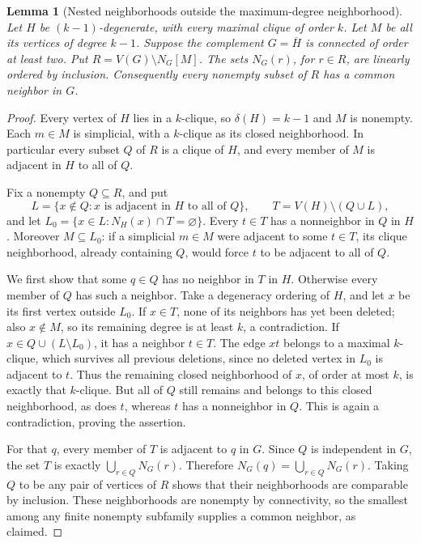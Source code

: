 \documentclass[11pt,a4paper]{article}
\newtheorem{lemma}[theorem]{Lemma}
\theoremstyle{remark}
\begin{document}
\begin{lemma}[Nested neighborhoods outside the maximum-degree neighborhood]
\label{r9:common}
Let $H$ be $(k-1)$-degenerate, with every maximal clique of order $k$.
Let $M$ be all its vertices of degree $k-1$.
Suppose the complement $G=\overline H$ is connected of order at least
two. Put $R=V(G)\setminus N_G[M]$.
The sets $N_G(r)$, for $r\in R$, are linearly ordered by inclusion.
Consequently every nonempty subset of $R$ has a common neighbor in $G$.
\end{lemma}
\begin{proof}
Every vertex of $H$ lies in a $k$-clique, so $\delta(H)=k-1$ and
$M$ is nonempty. Each $m\in M$ is simplicial, with a $k$-clique as
its closed neighborhood. In particular every subset $Q$ of $R$ is
a clique of $H$, and every member of $M$ is adjacent in $H$ to all of $Q$.

Fix a nonempty $Q\subseteq R$, and put
\[
 L=\{x\notin Q:x\text{ is adjacent in }H\text{ to all of }Q\},
 \qquad T=V(H)\setminus(Q\cup L),
\]
and let $L_0=\{x\in L:N_H(x)\cap T=\varnothing\}$.
Every $t\in T$ has a nonneighbor in $Q$ in $H$.
Moreover $M\subseteq L_0$: if a simplicial $m\in M$ were adjacent
to some $t\in T$, its clique neighborhood, already containing $Q$,
would force $t$ to be adjacent to all of $Q$.

We first show that some $q\in Q$ has no neighbor in $T$ in $H$.
Otherwise every member of $Q$ has such a neighbor.
Take a degeneracy ordering of $H$, and let $x$ be its first vertex
outside $L_0$. If $x\in T$, none of its neighbors has yet been
deleted; also $x\notin M$, so its remaining degree is at least $k$,
a contradiction. If $x\in Q\cup(L\setminus L_0)$, it has a
neighbor $t\in T$. The edge $xt$ belongs to a maximal $k$-clique,
which survives all previous deletions, since no deleted vertex in
$L_0$ is adjacent to $t$. Thus the remaining closed neighborhood
of $x$, of order at most $k$, is exactly that $k$-clique.
But all of $Q$ still remains and belongs to this closed neighborhood,
as does $t$, whereas $t$ has a nonneighbor in $Q$. This is again a
contradiction, proving the assertion.

For that $q$, every member of $T$ is adjacent to $q$ in $G$.
Since $Q$ is independent in $G$, the set $T$ is exactly
$\bigcup_{r\in Q}N_G(r)$. Therefore
$N_G(q)=\bigcup_{r\in Q}N_G(r)$.
Taking $Q$ to be any pair of vertices of $R$ shows that their
neighborhoods are comparable by inclusion. These neighborhoods are
nonempty by connectivity, so the smallest among any finite nonempty
subfamily supplies a common neighbor, as claimed.
\end{proof}
\end{document}
